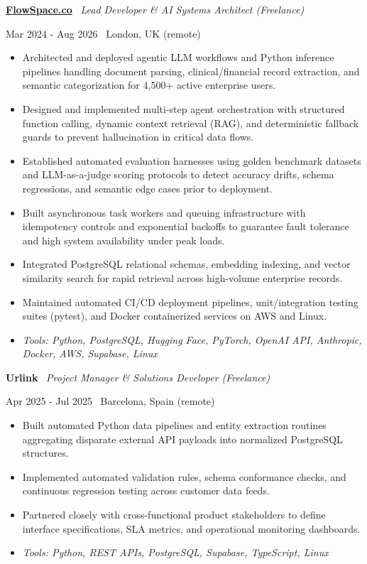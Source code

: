 \documentclass[a4paper,10pt]{article}
\newcommand{\role}[4]{%
 \vspace{2pt}\noindent
 \begin{minipage}[t]{0.70\textwidth}\raggedright\textbf{#1} \textbullet\ \textit{#3}\end{minipage}%
 \hfill
 \begin{minipage}[t]{0.28\textwidth}\raggedleft\footnotesize\color{gray}#2 \textbullet\ #4\end{minipage}%
 \vspace{1pt}%
}
\begin{document}
\role{\href{https://flowspace.co}{FlowSpace.co}}{Mar 2024 - Aug 2026}{Lead Developer \& AI Systems Architect (Freelance)}{London, UK (remote)}
\begin{itemize}
 \item Architected and deployed agentic LLM workflows and Python inference pipelines handling document parsing, clinical/financial record extraction, and semantic categorization for 4,500+ active enterprise users.
 \item Designed and implemented multi-step agent orchestration with structured function calling, dynamic context retrieval (RAG), and deterministic fallback guards to prevent hallucination in critical data flows.
 \item Established automated evaluation harnesses using golden benchmark datasets and LLM-as-a-judge scoring protocols to detect accuracy drifts, schema regressions, and semantic edge cases prior to deployment.
 \item Built asynchronous task workers and queuing infrastructure with idempotency controls and exponential backoffs to guarantee fault tolerance and high system availability under peak loads.
 \item Integrated PostgreSQL relational schemas, embedding indexing, and vector similarity search for rapid retrieval across high-volume enterprise records.
 \item Maintained automated CI/CD deployment pipelines, unit/integration testing suites (pytest), and Docker containerized services on AWS and Linux.
 \item \textit{Tools: Python, PostgreSQL, Hugging Face, PyTorch, OpenAI API, Anthropic, Docker, AWS, Supabase, Linux}
\end{itemize}

\role{Urlink}{Apr 2025 - Jul 2025}{Project Manager \& Solutions Developer (Freelance)}{Barcelona, Spain (remote)}
\begin{itemize}
 \item Built automated Python data pipelines and entity extraction routines aggregating disparate external API payloads into normalized PostgreSQL structures.
 \item Implemented automated validation rules, schema conformance checks, and continuous regression testing across customer data feeds.
 \item Partnered closely with cross-functional product stakeholders to define interface specifications, SLA metrics, and operational monitoring dashboards.
 \item \textit{Tools: Python, REST APIs, PostgreSQL, Supabase, TypeScript, Linux}
\end{itemize}
\end{document}
